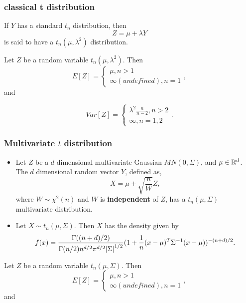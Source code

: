 \begin{refsection}
\subsubsection{classical t distribution}
\begin{definition}\cite[95]{ruppert2015statistics}
If $Y$ has a standard $t_n$ distribution, then $$Z = \mu + \lambda Y$$
is said to have a $t_n(\mu,\lambda^2)$ distribution.
\end{definition}

\begin{lemma}
Let $Z$ be a random variable $t_n(\mu,\lambda^2)$. Then
	$$E[Z] = \begin{cases}
	\mu, n > 1 \\
	\infty (undefined), n=1
	\end{cases},$$ 
and	
	
	$$Var[Z] = \begin{cases}
	\lambda^2\frac{n}{n-2}, n > 2 \\
	\infty, n=1,2
	\end{cases}.$$ 
\end{lemma}

\subsubsection{Multivariate $t$ distribution}
\begin{definition}\cite{ruppert2015statistics}\label{ch:theory-of-statistics:def:MultivariateTDistribution}\hfill
\begin{itemize}
	\item Let $Z$ be a $d$ dimensional multivariate Gaussian $MN(0,\Sigma)$, and $\mu \in \mathbb{R}^d$. The $d$ dimensional random vector $Y$, defined as, $$X = \mu + \sqrt{\frac{n}{W}}Z,$$
	where $W\sim \chi^2(n)$ and $W$ is \textbf{independent} of $Z$,
	has a $t_n(\mu,\Sigma)$ multivariate distribution.
	\item Let $X \sim t_n(\mu, \Sigma)$. Then $X$ has the density given by
	$$f(x) = \frac{\Gamma((n+d)/2)}{\Gamma(n/2)n^{d/2}\pi^{d/2}\abs{\Sigma}^{1/2}}(1 + \frac{1}{n}(x-\mu)^T\Sigma^{-1}(x-\mu))^{-(n+d)/2}.$$
\end{itemize}	

\end{definition}

\begin{lemma}
	Let $Z$ be a random variable $t_n(\mu,\Sigma)$. Then
	$$E[Z] = \begin{cases}
	\mu, n > 1 \\
	\infty (undefined), n=1
	\end{cases},$$ 
	and	
	

\end{lemma}
\end{refsection}
